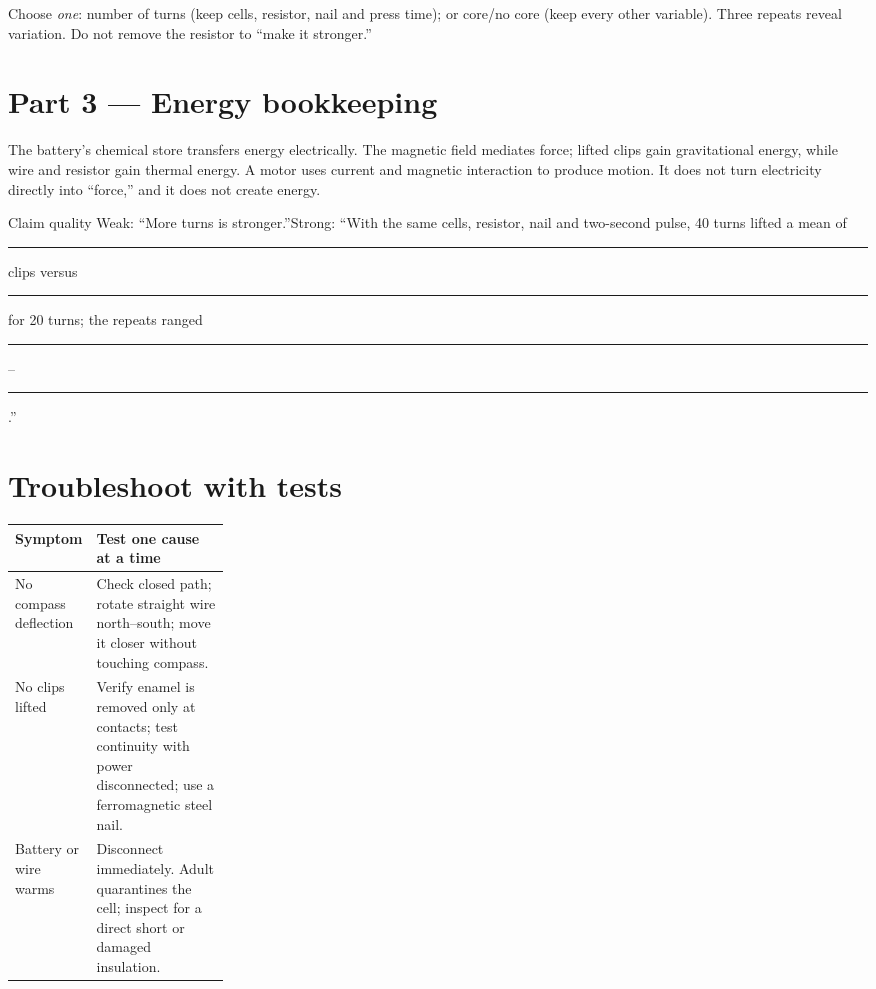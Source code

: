 Choose \emph{one}: number of turns (keep cells, resistor, nail and press time);
or core/no core (keep every other variable). Three repeats reveal variation.
Do not remove the resistor to “make it stronger.”

\section{Part 3 — Energy bookkeeping}
The battery's chemical store transfers energy electrically. The magnetic field
mediates force; lifted clips gain gravitational energy, while wire and resistor
gain thermal energy. A motor uses current and magnetic interaction to produce
motion. It does not turn electricity directly into “force,” and it does not
create energy.

\begin{telospanel}{Claim quality}
Weak: “More turns is stronger.”\quad Strong: “With the same cells, resistor,
nail and two-second pulse, 40 turns lifted a mean of \rule{1cm}{.3pt} clips
versus \rule{1cm}{.3pt} for 20 turns; the repeats ranged
\rule{1cm}{.3pt}--\rule{1cm}{.3pt}.”
\end{telospanel}

\section{Troubleshoot with tests}
\begin{tabularx}{\linewidth}{@{}p{0.25\linewidth}L@{}}
\toprule Symptom & Test one cause at a time\\ \midrule
No compass deflection & Check closed path; rotate straight wire north--south;
move it closer without touching compass.\\
No clips lifted & Verify enamel is removed only at contacts; test continuity
with power disconnected; use a ferromagnetic steel nail.\\
Battery or wire warms & Disconnect immediately. Adult quarantines the cell;
inspect for a direct short or damaged insulation.\\
\bottomrule
\end{tabularx}


